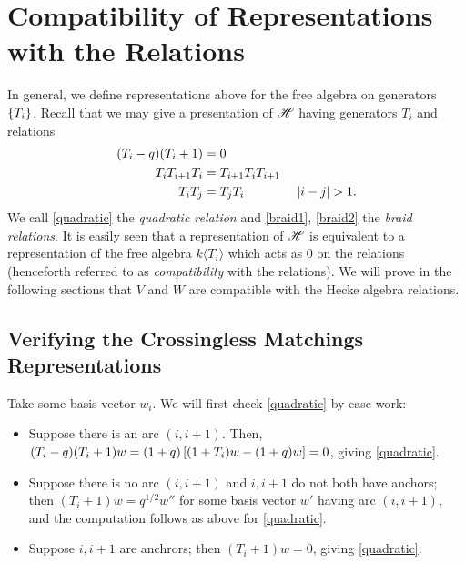 \documentclass{amsart}
\begin{document}
\section{Compatibility of Representations with the Relations}
In general, we define representations above for the free algebra on generators $\left\{ T_i \right\}$.
Recall that we may give a presentation of $\mathscr{H}$ having generators $T_i$ and relations
\begin{align}
  (T_i - q)(T_i + 1) &= 0 \label{quadratic}\\
  T_iT_{i+1}T_i &= T_{i+1}T_iT_{i+1} \label{braid1}\\ 
  T_iT_j &= T_jT_i \hspace{40pt} \left| i - j \right| > 1. \label{braid2}
\end{align}
We call \eqref{quadratic} the \emph{quadratic relation} and \eqref{braid1}, \eqref{braid2} the \emph{braid relations}.
It is easily seen that a representation of $\mathscr{H}$ is equivalent to a representation of the free algebra $k\langle T_i \rangle$ which acts as 0 on the relations (henceforth referred to as \emph{compatibility} with the relations).
We will prove in the following sections that $V$ and $W$ are compatible with the Hecke algebra relations.

\subsection{Verifying the Crossingless Matchings Representations}
\label{Cross Relations}
Take some basis vector $w_i$.
We will first check \eqref{quadratic} by case work:
\begin{itemize}
  \item Suppose there is an arc $(i,i+1)$.
    Then, $(T_i-q)(T_i + 1)w = (1 + q)\left[ (1 + T_i)w - (1 + q)w \right] = 0$, giving \eqref{quadratic}.

 
  \item Suppose there is no arc $(i,i+1)$ and $i,i+1$ do not both have anchors;
    then $(T_i +  1)w = q^{1/2}w''$ for some basis vector $w'$ having arc $(i,i+1)$, and the computation follows as above for \eqref{quadratic}.
  \item Suppose $i,i+1$ are anchrors;
    then $(T_i + 1)w = 0$, giving \eqref{quadratic}.
\end{itemize}
  
\end{document}
